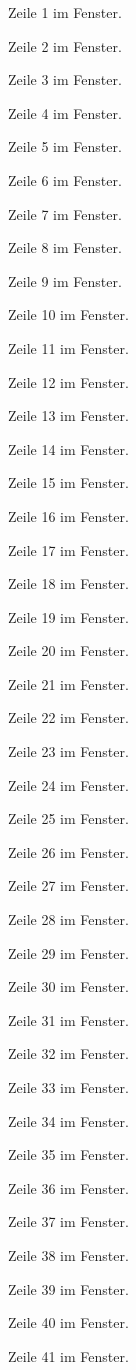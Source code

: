 \begin{Figure}[title=Tall Figure]
Zeile 1 im Fenster.

Zeile 2 im Fenster.

Zeile 3 im Fenster.

Zeile 4 im Fenster.

Zeile 5 im Fenster.

Zeile 6 im Fenster.

Zeile 7 im Fenster.

Zeile 8 im Fenster.

Zeile 9 im Fenster.

Zeile 10 im Fenster.

Zeile 11 im Fenster.

Zeile 12 im Fenster.

Zeile 13 im Fenster.

Zeile 14 im Fenster.

Zeile 15 im Fenster.

Zeile 16 im Fenster.

Zeile 17 im Fenster.

Zeile 18 im Fenster.

Zeile 19 im Fenster.

Zeile 20 im Fenster.

Zeile 21 im Fenster.

Zeile 22 im Fenster.

Zeile 23 im Fenster.

Zeile 24 im Fenster.

Zeile 25 im Fenster.

Zeile 26 im Fenster.

Zeile 27 im Fenster.

Zeile 28 im Fenster.

Zeile 29 im Fenster.

Zeile 30 im Fenster.

Zeile 31 im Fenster.

Zeile 32 im Fenster.

Zeile 33 im Fenster.

Zeile 34 im Fenster.

Zeile 35 im Fenster.

Zeile 36 im Fenster.

Zeile 37 im Fenster.

Zeile 38 im Fenster.

Zeile 39 im Fenster.

Zeile 40 im Fenster.

Zeile 41 im Fenster.


\end{Figure}
